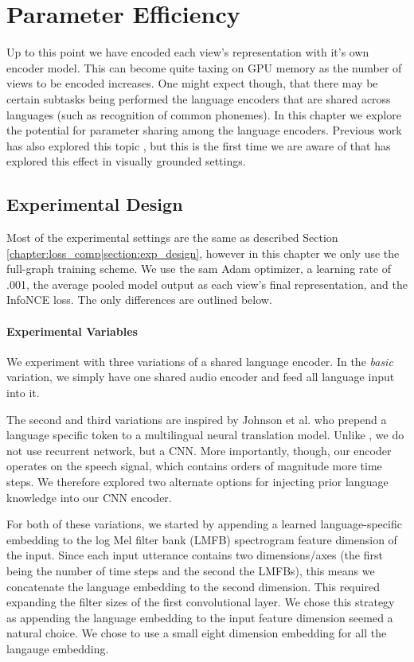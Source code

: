 \chapter{Parameter Efficiency}
Up to this point we have encoded each view's representation with it's own encoder model.
This can become quite taxing on GPU memory as the number of views to be encoded increases.
One might expect though, that there may be certain subtasks being performed the language encoders that are shared across languages (such as recognition of common phonemes).
In this chapter we explore the potential for parameter sharing among the language encoders.
Previous work has also explored this topic , but this is the first time we are aware of that has explored this effect in visually grounded settings.

\section{Experimental Design}
\label{chapter:param_eff|section:exp_design}
Most of the experimental settings are the same as described Section \ref{chapter:loss_comp|section:exp_design}, however in this chapter we only use the full-graph training scheme.
We use the sam Adam optimizer, a learning rate of .001, the average pooled model output as each view's final representation, and the InfoNCE loss.
The only differences are outlined below.
\subsubsection{Experimental Variables}
\label{chapter:param_eff|section:exp_variables}
We experiment with three variations of a shared language encoder. 
In the \textit{basic} variation, we simply have one shared audio encoder and feed all language input into it.

The second and third variations are inspired by Johnson et al. \cite{johnson2017google} who prepend a language specific token to a multilingual neural translation model.
Unlike \cite{johnson2017google}, we do not use recurrent network, but a CNN. 
More importantly, though, our encoder operates on the speech signal, which contains orders of magnitude more time steps.
We therefore explored two alternate options for injecting prior language knowledge into our CNN encoder.


For both of these variations, we started by appending a learned language-specific embedding to the log Mel filter bank  (LMFB) spectrogram feature dimension of the input.
Since each input utterance contains two dimensions/axes (the first being the number of time steps and the second the LMFBs), this means we concatenate the language embedding to the second dimension.
This required expanding the filter sizes of the first convolutional layer.
We chose this strategy as appending the language embedding to the input feature dimension seemed a natural choice.
We chose to use a small eight dimension embedding for all the langauge embedding.

